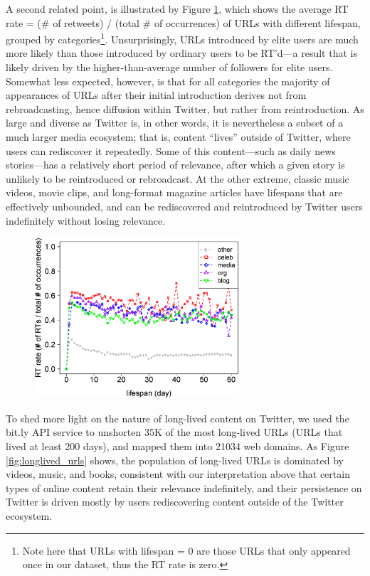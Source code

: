 \documentclass[phd,tocprelim]{cornell}
\renewcommand{\caption}[1]{\singlespacing\hangcaption{#1}\normalspacing}
\begin{document}
A second related point, is illustrated by Figure
\ref{fig:RT_lifespan_category}, which shows the average RT rate = (\# of
retweets) / (total \# of occurrences) of URLs with different lifespan,
grouped by categories\footnote{Note here that URLs with lifespan = 0 are
  those URLs that only appeared once in our dataset, thus the RT rate is
  zero.}. 
%
Unsurprisingly, URLs introduced by elite users are much more likely than
those introduced by ordinary users to be RT'd---a result that is likely
driven by the higher-than-average number of followers for elite users.
Somewhat less expected, however, is that for all categories the majority of
appearances of URLs after their initial introduction derives not from
rebroadcasting, hence diffusion within Twitter, but rather from
reintroduction. As large and diverse as Twitter is, in other words, it is
nevertheless a subset of a much larger media ecosystem; that is, content
``lives'' outside of Twitter, where users can rediscover it
repeatedly. Some of this content---such as daily news stories---has a
relatively short period of relevance, after which a given story is unlikely
to be reintroduced or rebroadcast. At the other extreme, classic music
videos, movie clips, and long-format magazine articles have lifespans that
are effectively unbounded, and can be rediscovered and reintroduced by
Twitter users indefinitely without losing relevance.

\begin{figure}
\centering
\includegraphics[width=3in]{figures/url_lifespan_RTrate_by_categories_500K_censored.eps}
\caption{Lifetime ~ avg RT rate, by categories}
\label{fig:RT_lifespan_category}
\end{figure}

To shed more light on the nature of long-lived content on Twitter, we used
the bit.ly API service to unshorten 35K of the most long-lived URLs (URLs
that lived at least 200 days), and mapped them into 21034 web domains. As
Figure \ref{fig:longlived_urls} shows, the population of long-lived URLs is
dominated by videos, music, and books, consistent with our interpretation
above that certain types of online content retain their relevance
indefinitely, and their persistence on Twitter is driven mostly by users
rediscovering content outside of the Twitter ecosystem.
\end{document}
